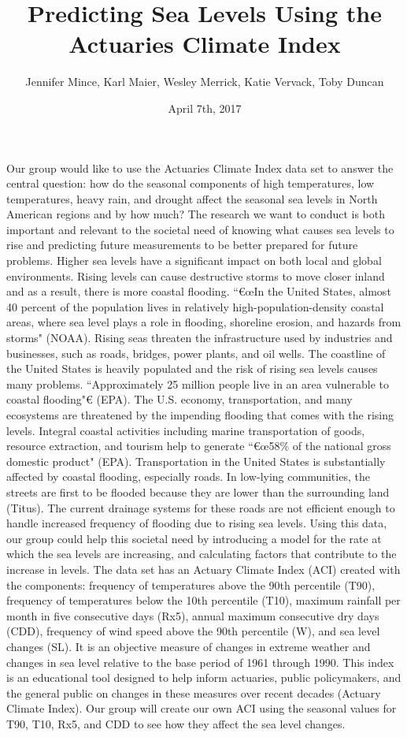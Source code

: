 \documentclass[letterpaper]{report}
\title{Predicting Sea Levels Using the Actuaries Climate Index}
\date{April 7th, 2017}
\author{Jennifer Mince, Karl Maier, Wesley Merrick, Katie Vervack, Toby Duncan}
\begin{document}
	\maketitle

		Our group would like to use the Actuaries Climate Index data set to answer the central question: how do the seasonal components of high temperatures, low temperatures, heavy rain, and drought affect the seasonal sea levels in North American regions and by how much?
		The research we want to conduct is both important and relevant to the societal need of knowing what causes sea levels to rise and predicting future measurements to be better prepared for future problems. Higher sea levels have a significant impact on both local and global environments. Rising levels can cause destructive storms to move closer inland and as a result, there is more coastal flooding. \textquotedblleft€œIn the United States, almost 40 percent of the population lives in relatively high-population-density coastal areas, where sea level plays a role in flooding, shoreline erosion, and hazards from storms" (NOAA). Rising seas threaten the infrastructure used by industries and businesses, such as roads, bridges, power plants, and oil wells. The coastline of the United States is heavily populated and the risk of rising sea levels causes many problems. \textquotedblleft Approximately 25 million people live in an area vulnerable to coastal flooding"€ (EPA). The U.S. economy, transportation, and many ecosystems are threatened by the impending flooding that comes with the rising levels. Integral coastal activities including marine transportation of goods, resource extraction, and tourism help to generate \textquotedblleft€œ58\% of the national gross domestic product" (EPA). Transportation in the United States is substantially affected by coastal flooding, especially roads. In low-lying communities, the streets are first to be flooded because they are lower than the surrounding land (Titus). The current drainage systems for these roads are not efficient enough to handle increased frequency of flooding due to rising sea levels. 
		Using this data, our group could help this societal need by introducing a model for the rate at which the sea levels are increasing, and calculating factors that contribute to the increase in levels. The data set has an Actuary Climate Index (ACI) created with the components: frequency of temperatures above the 90th percentile (T90), frequency of temperatures below the 10th percentile (T10), maximum rainfall per month in five consecutive days (Rx5), annual maximum consecutive dry days (CDD), frequency of wind speed above the 90th percentile (W), and sea level changes (SL). It is an objective measure of changes in extreme weather and changes in sea level relative to the base period of 1961 through 1990. This index is an educational tool designed to help inform actuaries, public policymakers, and the general public on changes in these measures over recent decades (Actuary Climate Index). Our group will create our own ACI using the seasonal values for T90, T10, Rx5, and CDD to see how they affect the sea level changes. 
\end{document}
